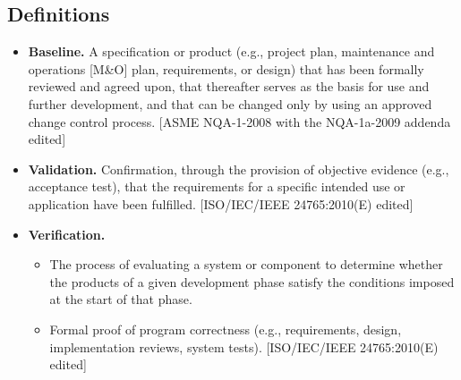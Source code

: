 \subsection{Definitions}
\begin{itemize}
  \item \textbf{Baseline.} A specification or product (e.g., project plan, maintenance and operations [M\&O] plan, requirements, or 
design) that has been formally reviewed and agreed upon, that thereafter serves as the basis for use and further 
development, and that can be changed only by using an approved change control process. [ASME NQA-1-2008 with the 
NQA-1a-2009 addenda edited]
  \item \textbf{Validation.} Confirmation, through the provision of objective evidence (e.g., acceptance test), that the requirements 
for a specific intended use or application have been fulfilled. [ISO/IEC/IEEE 24765:2010(E) edited]
  \item \textbf{Verification.}
  \begin{itemize}
     \item The process of evaluating a system or component to determine whether the products of a given development 
     phase satisfy the conditions imposed at the start of that phase.
     \item  Formal proof of program correctness (e.g., requirements, design, implementation reviews, system tests). 
     [ISO/IEC/IEEE 24765:2010(E) edited]
  \end{itemize}
\end{itemize}

